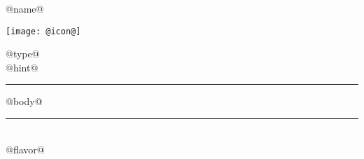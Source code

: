 \documentclass[17pt,a4paper,extrafontsizes]{memoir}
\begin{document}

\Fontauri{}

\noindent
{\Large @name@}

\rmfamily

\begin{multicols}{2}
	\noindent
	{\texttt{[image: @icon@]}}
	\\

	\vfill

	\noindent
	@type@\\
	{\footnotesize{}@hint@}\\
\end{multicols}

\vspace{-14mm}

\begin{adjustwidth}{-4mm}{0mm}
	\begin{center}
		\rule{1.1\textwidth}{.6mm}
	\end{center}
\end{adjustwidth}

\begin{Spacing}{0.90}
	\small
	@body@
	\vfill
	\begin{center}
		\rule{.6\textwidth}{.4mm}\\
		\vspace{2mm}
		@flavor@
	\end{center}
\end{Spacing}

\clearpage %
\end{document}
